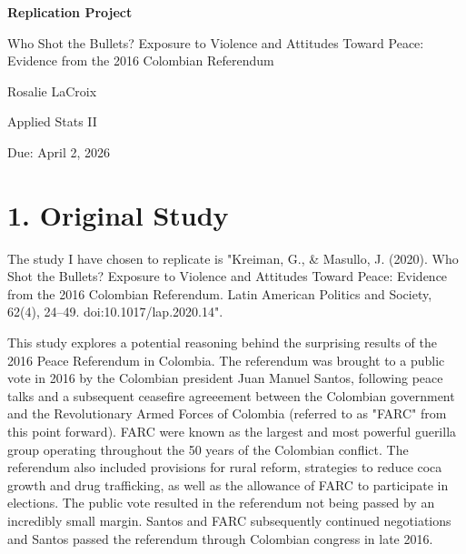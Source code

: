 \documentclass[12pt,letterpaper]{article}
\begin{document}
	
	\begin{titlepage}
		\centering
		{\LARGE\bfseries Replication Project}
		
		\vspace{1cm}
		
		{\Large Who Shot the Bullets? Exposure to Violence and Attitudes Toward Peace: Evidence from the 2016 Colombian Referendum}
		
		\vspace{1cm}
		
		{\normalsize Rosalie LaCroix}
		
		{\normalsize Applied Stats II}
		
		{\normalsize Due: April 2, 2026}
	\end{titlepage}
	
	
	\section*{1. Original Study}
	
	The study I have chosen to replicate is "Kreiman, G., \& Masullo, J. (2020). Who Shot the Bullets? Exposure to Violence and Attitudes Toward Peace: Evidence from the 2016 Colombian Referendum. Latin American Politics and Society, 62(4), 24–49. doi:10.1017/lap.2020.14". 
	
	This study explores a potential reasoning behind the surprising results of the 2016 Peace Referendum in Colombia. The referendum was brought to a public vote in 2016 by the Colombian president Juan Manuel Santos, following peace talks and a subsequent ceasefire agreeement between the Colombian government and the Revolutionary Armed Forces of Colombia (referred to as "FARC" from this point forward). FARC were known as the largest and most powerful guerilla group operating throughout the 50 years of the Colombian conflict. The referendum also included provisions for rural reform, strategies to reduce coca growth and drug trafficking, as well as the allowance of FARC to participate in elections. The public vote resulted in the referendum not being passed by an incredibly small margin. Santos and FARC subsequently continued negotiations and Santos passed the referendum through Colombian congress in late 2016.
	
\end{document}
